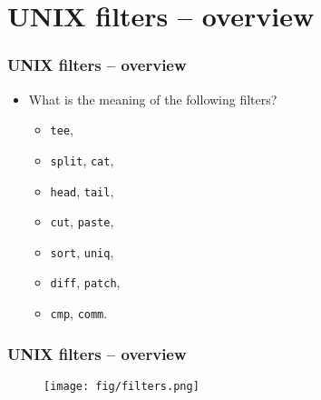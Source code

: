 \section{UNIX filters – overview} 
\begin{frame}[fragile]
\frametitle{UNIX filters – overview}
	\begin{itemize}

		\item  What is the meaning of the following filters?
				
		\begin{itemize}
			\item \texttt{tee},
			\item \texttt{split}, \texttt{cat},
			\item \texttt{head}, \texttt{tail},
			\item \texttt{cut}, \texttt{paste},
			\item \texttt{sort}, \texttt{uniq},
			\item \texttt{diff}, \texttt{patch},
			\item \texttt{cmp}, \texttt{comm}.
		\end{itemize}
		
	\end{itemize}
\end{frame}

\begin{frame}[fragile]
\frametitle{UNIX filters – overview}

	\begin{figure}[h]
	 	\centering
        		\texttt{[image: fig/filters.png]}
	\end{figure}

\end{frame}

